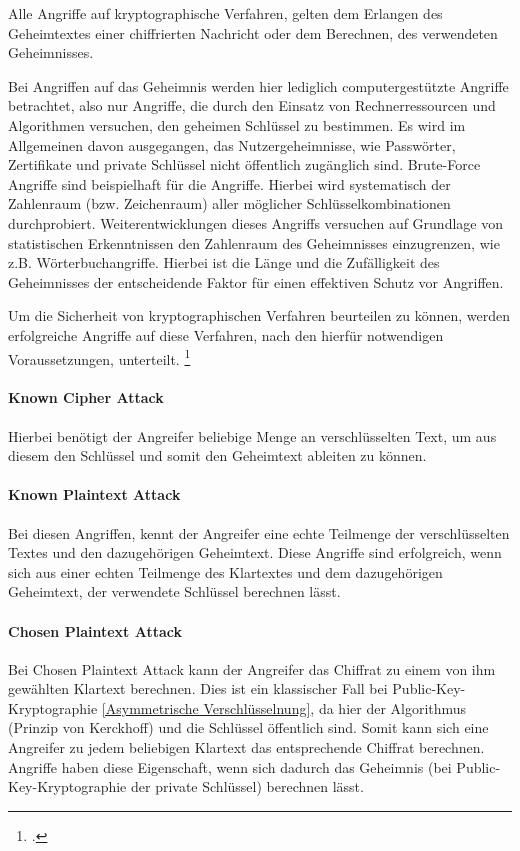         Alle Angriffe auf kryptographische Verfahren, gelten dem Erlangen des Geheimtextes einer chiffrierten Nachricht oder dem Berechnen, des verwendeten Geheimnisses.

        Bei Angriffen auf das Geheimnis werden hier lediglich computergestützte Angriffe betrachtet, also nur Angriffe, die durch den Einsatz von Rechnerressourcen und Algorithmen versuchen, den geheimen Schlüssel zu bestimmen. Es wird im Allgemeinen davon ausgegangen, das Nutzergeheimnisse, wie Passwörter, Zertifikate und private Schlüssel nicht öffentlich zugänglich sind.
        Brute-Force Angriffe sind beispielhaft für die Angriffe. Hierbei wird systematisch der Zahlenraum (bzw. Zeichenraum) aller möglicher Schlüsselkombinationen durchprobiert. Weiterentwicklungen dieses Angriffs versuchen auf Grundlage von statistischen Erkenntnissen den Zahlenraum des Geheimnisses einzugrenzen, wie z.B. Wörterbuchangriffe. Hierbei ist die Länge und die Zufälligkeit des Geheimnisses der entscheidende Faktor für einen effektiven Schutz vor Angriffen.
        
        Um die Sicherheit von kryptographischen Verfahren beurteilen zu können, werden erfolgreiche Angriffe auf diese Verfahren, nach den hierfür notwendigen Voraussetzungen, unterteilt. \footcite[20]{Beutelspacher.2015}
        \paragraph{Known Cipher Attack}
            Hierbei benötigt der Angreifer beliebige Menge an verschlüsselten Text, um aus diesem den Schlüssel und somit den Geheimtext ableiten zu können.
        \paragraph{Known Plaintext Attack}
            Bei diesen Angriffen, kennt der Angreifer eine echte Teilmenge der verschlüsselten Textes und den dazugehörigen Geheimtext. Diese Angriffe sind erfolgreich, wenn sich aus einer echten Teilmenge des Klartextes und dem dazugehörigen Geheimtext, der verwendete Schlüssel berechnen lässt.  
        \paragraph{Chosen Plaintext Attack}
            Bei Chosen Plaintext Attack kann der Angreifer das Chiffrat zu einem von ihm gewählten Klartext berechnen. Dies ist ein klassischer Fall bei Public-Key-Kryptographie \ref{Asymmetrische Verschlüsselnung}, da hier der Algorithmus (Prinzip von Kerckhoff) und die Schlüssel öffentlich sind. Somit kann sich eine Angreifer zu jedem beliebigen Klartext das entsprechende Chiffrat berechnen. Angriffe haben diese Eigenschaft, wenn sich dadurch das Geheimnis (bei Public-Key-Kryptographie der private Schlüssel) berechnen lässt.
        
